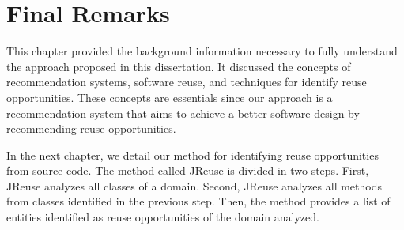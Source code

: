 \section{Final Remarks}
\label{ch3:finalRemarks}

This chapter provided the background information necessary to fully understand the approach
proposed in this dissertation. It discussed the concepts of recommendation systems, software reuse, and techniques for identify reuse opportunities. These concepts are essentials since our approach is a recommendation system that aims to achieve a better software design by recommending reuse opportunities. 

In the next chapter, we detail our method for identifying reuse opportunities from source code. The method called JReuse is divided in two steps. First, JReuse analyzes all classes of a domain. Second, JReuse analyzes all methods from classes identified in the previous step. Then, the method provides a list of  entities identified as reuse opportunities of the domain analyzed.